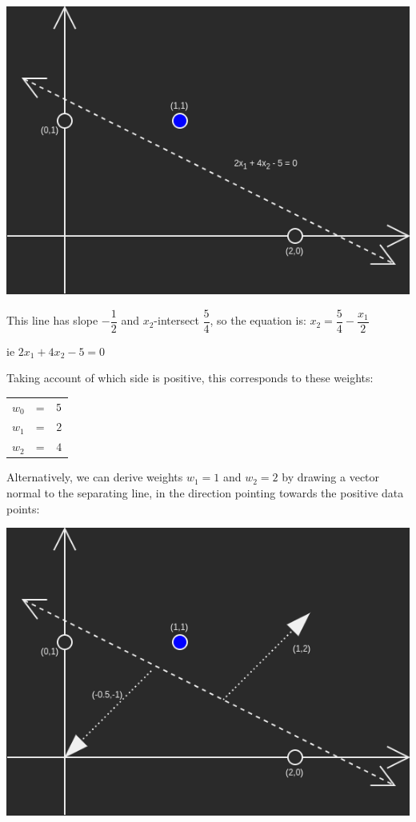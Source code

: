 \documentclass[11pt]{article}
\begin{document}
\includegraphics[width=\textwidth,height=\textheight,keepaspectratio]{images/graph_1}

This line has slope \(-\dfrac{1}{2}\) and \(x_2\)-intersect \(\dfrac{5}{4}\), so the equation is:
\(x_2 = \dfrac{5}{4} - \dfrac{x_1}{2}\)

ie \(2x_1 + 4x_2 - 5 = 0\)

Taking account of which side is positive, this corresponds to these weights:

\begin{center}
\begin{tabular}{ |c|c|c| }
    \(w_0\) & = & \(\-5\) \\
    \(w_1\) & = & \(2\) \\
    \(w_2\) & = & \(4\)
\end{tabular}
\end{center}

Alternatively, we can derive weights \(w_1 = 1\) and \(w_2=2\) by drawing a vector normal to the separating line, in the direction pointing towards the positive data points:

\includegraphics[width=\textwidth,height=\textheight,keepaspectratio]{images/graph_2}
\end{document}
